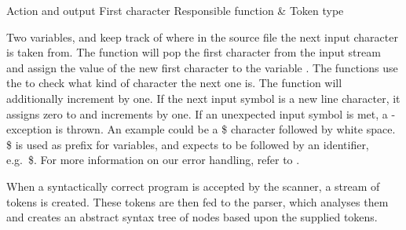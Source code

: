                  		 {Action and output												}
       {First character	}{Responsible function	& Token type							}{
}


Two variables,   and 
 keep track of where in the source file the next input
character is taken from. The function  will pop
the first character from the input stream and assign the value of
the new first character to the variable . The
 functions use the 
to check what kind of character the next one is. The 
function will additionally increment  by one. If
the next input symbol is a new line character, it assigns zero to
 and increments  by one. If an unexpected
input symbol is met, a -exception is thrown. An
example could be a \$ character followed by white space. \$ is used as
prefix for variables, and expects to be followed by an identifier, e.g.\
\$. For more information on our error handling, refer to
\secref{sec:errorhandling}.
 


When a syntactically correct program is accepted by the scanner, a
stream of tokens is created. These tokens are then fed to the parser,
which analyses them and creates an abstract syntax tree of nodes based
upon the supplied tokens.
